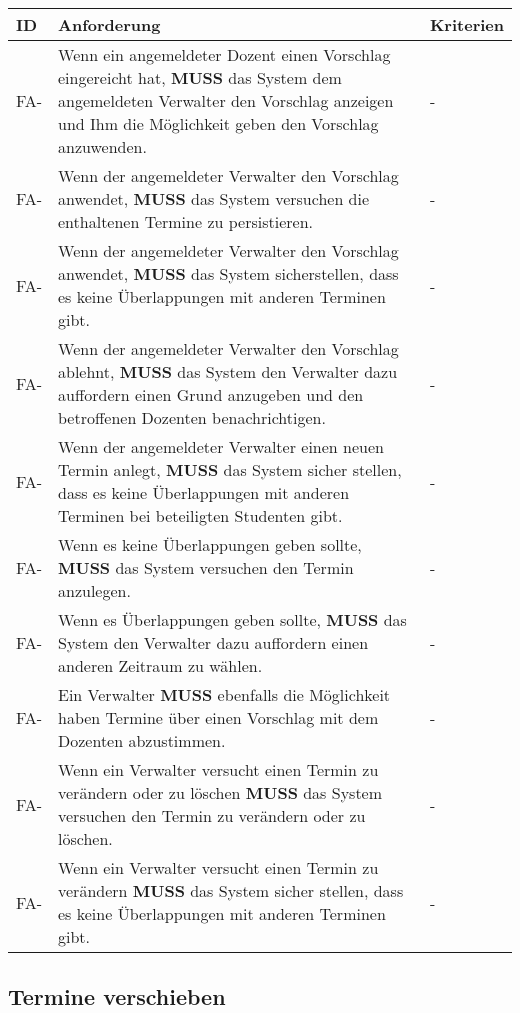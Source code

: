 \begin{tabular} {|p{}|p{11cm}|p{}|}
	\hline
	ID & Anforderung & Kriterien \\
	\hline
	FA-
	& Wenn ein angemeldeter Dozent einen Vorschlag eingereicht hat, \textbf{MUSS} das System dem angemeldeten Verwalter den Vorschlag anzeigen und Ihm die Möglichkeit geben den Vorschlag anzuwenden. 
	& - \\
	\hline
	FA-
	& Wenn der angemeldeter Verwalter den Vorschlag anwendet, \textbf{MUSS} das System versuchen die enthaltenen Termine zu persistieren.
	& - \\
	\hline
	FA-
	& Wenn der angemeldeter Verwalter den Vorschlag anwendet, \textbf{MUSS} das System sicherstellen, dass es keine Überlappungen mit anderen Terminen gibt.
	& - \\
	\hline
	FA-
	& Wenn der angemeldeter Verwalter den Vorschlag ablehnt, \textbf{MUSS} das System den Verwalter dazu auffordern einen Grund anzugeben und den betroffenen Dozenten benachrichtigen.
	& - \\
	\hline
	FA-
	& Wenn der angemeldeter Verwalter einen neuen Termin anlegt, \textbf{MUSS} das System sicher stellen, dass es keine Überlappungen mit anderen Terminen bei beteiligten Studenten gibt.
	& - \\
	\hline
	FA-
	& Wenn es keine Überlappungen geben sollte, \textbf{MUSS} das System versuchen den Termin anzulegen.
	& - \\
	\hline
	FA-
	& Wenn es Überlappungen geben sollte, \textbf{MUSS} das System den Verwalter dazu auffordern einen anderen Zeitraum zu wählen.
	& - \\
	\hline
	FA-
	& Ein Verwalter \textbf{MUSS} ebenfalls die Möglichkeit haben Termine über einen Vorschlag mit dem Dozenten abzustimmen.
	& - \\
	\hline
	FA-
	& Wenn ein Verwalter versucht einen Termin zu verändern oder zu löschen \textbf{MUSS} das System versuchen den Termin zu verändern oder zu löschen.
	& - \\
	\hline
	FA-
	& Wenn ein Verwalter versucht einen Termin zu verändern \textbf{MUSS} das System sicher stellen, dass es keine Überlappungen mit anderen Terminen gibt.
	& - \\
	\hline
\end{tabular}

\newpage

\subsection{Termine verschieben}


